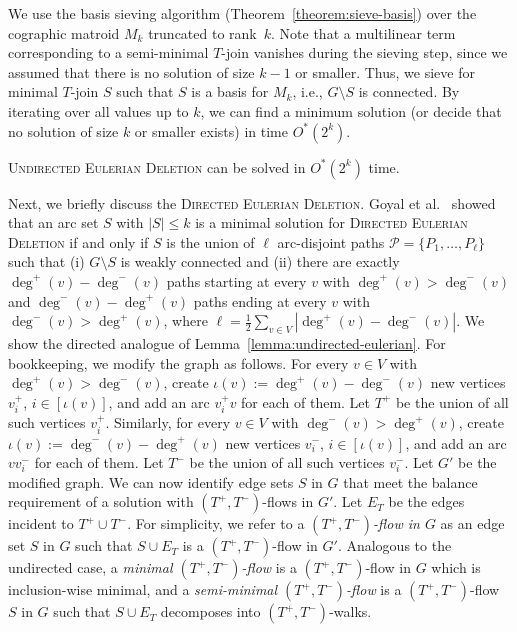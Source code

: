 \documentclass{theoretics}
\newcommand{\cP}{\ensuremath{\mathcal P}\xspace}
\begin{document}
We use the basis sieving algorithm (Theorem~\ref{theorem:sieve-basis}) over the cographic matroid $M_k$ truncated to rank~$k$.
Note that a multilinear term corresponding to a semi-minimal $T$-join vanishes during the sieving step, since we assumed that there is no solution of size $k - 1$ or smaller.
Thus, we sieve for minimal $T$-join $S$ such that $S$ is a basis for $M_k$, i.e., $G \setminus S$ is connected.
By iterating over all values up to $k$, we can find a minimum solution (or decide that no solution of size $k$ or smaller exists) in time $O^*(2^k)$.

\begin{theorem}
  \textsc{Undirected Eulerian Deletion} can be solved in $O^*(2^{k})$ time.
\end{theorem}

Next, we briefly discuss the \textsc{Directed Eulerian Deletion}.
Goyal et al.~\cite{GoyalMPPS18even} showed that an arc set $S$ with $|S| \le k$ is a minimal solution for \textsc{Directed Eulerian Deletion} if and only if $S$ is the union of $\ell$ arc-disjoint paths $\cP = \{ P_1, \dots, P_{\ell} \}$ such that (i) $G \setminus S$ is weakly connected and (ii) there are exactly $\deg^+(v) - \deg^-(v)$ paths starting at every $v$ with $\deg^+(v) > \deg^-(v)$ and $\deg^-(v) - \deg^+(v)$ paths ending at every $v$ with $\deg^-(v) > \deg^+(v)$, where $\ell = \frac{1}{2} \sum_{v \in V} |\deg^+(v) - \deg^-(v)|$.
We show the directed analogue of Lemma~\ref{lemma:undirected-eulerian}.
For bookkeeping, we modify the graph as follows. For every $v \in V$ with $\deg^+(v)>\deg^-(v)$, create
$\iota(v):=\deg^+(v)-\deg^-(v)$ new vertices $v_i^+$, $i \in [\iota(v)]$, and add an arc $v_i^+v$ for each of them.
Let $T^+$ be the union of all such vertices $v_i^+$. 
Similarly, for every $v \in V$ with $\deg^-(v)>\deg^+(v)$, create
$\iota(v) := \deg^-(v)-\deg^+(v)$ new vertices $v_i^-$, $i \in [\iota(v)]$, and add an arc $vv_i^-$ for each of them.
Let $T^-$ be the union of all such vertices $v_i^-$. 
Let $G'$ be the modified graph. We can now identify edge sets $S$ in $G$ that meet the balance requirement 
of a solution with $(T^+,T^-)$-flows in $G'$. Let $E_T$ be the edges incident to $T^+ \cup T^-$. 
For simplicity, we refer to a \emph{$(T^+,T^-)$-flow in $G$} as an edge set $S$ in $G$
such that $S \cup E_T$ is a $(T^+,T^-)$-flow in $G'$. Analogous to the undirected case,
a \emph{minimal $(T^+,T^-)$-flow} is a $(T^+, T^-)$-flow in $G$ which is inclusion-wise minimal,
and a \emph{semi-minimal $(T^+,T^-)$-flow} is a $(T^+,T^-)$-flow $S$ in $G$ such that $S \cup E_T$
decomposes into $(T^+,T^-)$-walks.
\end{document}
